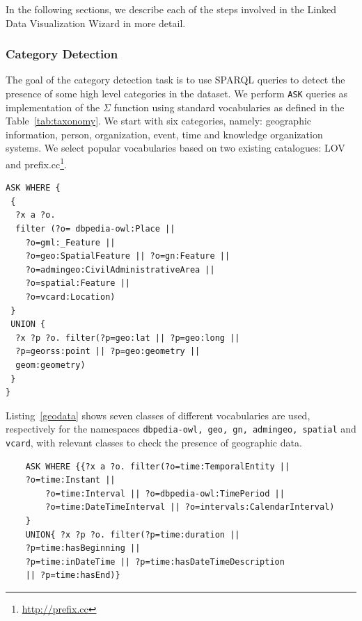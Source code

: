 In the following sections, we describe each of the steps involved in the Linked Data Visualization Wizard in more detail.

\subsubsection{Category Detection}
The goal of the category detection task is to use SPARQL queries to detect the presence of some high level categories in the dataset. We perform \texttt{ASK} queries as implementation of the $\Sigma $ function using standard vocabularies as defined in the Table~\ref{tab:taxonomy}. We start with six categories, namely: geographic information, person, organization, event, time and knowledge organization systems. We select popular vocabularies based on two existing catalogues: LOV~\cite{pyv2012} and prefix.cc\footnote{\url{http://prefix.cc}}.

\begin{lstlisting}
ASK WHERE {
 {
  ?x a ?o.
  filter (?o= dbpedia-owl:Place ||
    ?o=gml:_Feature ||
    ?o=geo:SpatialFeature || ?o=gn:Feature ||
    ?o=admingeo:CivilAdministrativeArea ||
    ?o=spatial:Feature ||
    ?o=vcard:Location)
 }
 UNION {
  ?x ?p ?o. filter(?p=geo:lat || ?p=geo:long ||
  ?p=georss:point || ?p=geo:geometry ||
  geom:geometry)
 }
}
\end{lstlisting}

 Listing~\ref{geodata} shows seven classes of different vocabularies are used, respectively for the namespaces \texttt{dbpedia-owl, geo, gn, admingeo, spatial} and \texttt{vcard}, with relevant classes to check the presence of geographic data.

\begin{lstlisting}
	ASK WHERE {{?x a ?o. filter(?o=time:TemporalEntity ||
	?o=time:Instant ||
		?o=time:Interval || ?o=dbpedia-owl:TimePeriod ||
		?o=time:DateTimeInterval || ?o=intervals:CalendarInterval)
	}
	UNION{ ?x ?p ?o. filter(?p=time:duration ||
	?p=time:hasBeginning ||
	?p=time:inDateTime || ?p=time:hasDateTimeDescription
	|| ?p=time:hasEnd)}

\end{lstlisting}

